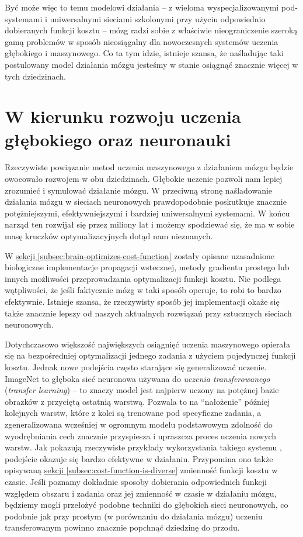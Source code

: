 Być może więc to temu modelowi działania -- z wieloma wyspecjalizowanymi pod-systemami i uniwersalnymi sieciami szkolonymi przy użyciu odpowiednio dobieranych funkcji kosztu -- mózg radzi sobie z właściwie nieograniczenie szeroką gamą problemów w sposób nieosiągalny dla nowoczesnych systemów uczenia głębokiego i maszynowego.
Co ta tym idzie, istnieje szansa, że naśladując taki postulowany model działania mózgu jesteśmy w stanie osiągnąć znacznie więcej w tych dziedzinach.

\section{W kierunku rozwoju uczenia głębokiego oraz neuronauki}

Rzeczywiste powiązanie metod uczenia maszynowego z działaniem mózgu będzie owocowało rozwojem w obu dziedzinach.
Głębokie uczenie pozwoli nam lepiej zrozumieć i symulować działanie mózgu.
W przeciwną stronę naśladowanie działania mózgu w sieciach neuronowych prawdopodobnie poskutkuje znacznie potężniejszymi, efektywniejszymi i bardziej uniwersalnymi systemami.
W końcu narząd ten rozwijał się przez miliony lat i możemy spodziewać się, że ma w sobie masę kruczków optymalizacyjnych dotąd nam nieznanych.

W \hyperref[subsec:brain-optimizes-cost-function]{sekcji \ref*{subsec:brain-optimizes-cost-function}} zostały opisane uzasadnione biologiczne implementacje propagacji wstecznej, metody gradientu prostego lub innych możliwości przeprowadzania optymalizacji funkcji kosztu.
Nie podlega wątpliwości, że jeśli faktycznie mózg w taki sposób operuje, to robi to bardzo efektywnie.
Istnieje szansa, że rzeczywisty sposób jej implementacji okaże się także znacznie lepszy od naszych aktualnych rozwiązań przy sztucznych sieciach neuronowych.

Dotychczasowo większość największych osiągnięć uczenia maszynowego opierała się na bezpośredniej optymalizacji jednego zadania z użyciem pojedynczej funkcji kosztu.
Jednak nowe podejścia często starające się generalizować uczenie.
ImageNet to głęboka sieć neuronowa używana do \emph{uczenia transferowanego} (\emph{transfer learning}) -- to znaczy model jest najpierw uczony na potężnej bazie obrazków z przyciętą ostatnią warstwą.
Pozwala to na ``nałożenie'' później kolejnych warstw, które z kolei są trenowane pod specyficzne zadania, a zgeneralizowana wcześniej w ogromnym modelu podstawowym zdolność do wyodrębniania cech znacznie przyspiesza i upraszcza proces uczenia nowych warstw.
Jak pokazują rzeczywiste przykłady wykorzystania takiego systemu \cite{marmanis2015deep}, podejście okazuje się bardzo efektywne w działaniu.
Przypomina ono także opisywaną \hyperref[subsec:cost-function-is-diverse]{sekcji \ref*{subsec:cost-function-is-diverse}} zmienność funkcji kosztu w czasie.
Jeśli poznamy dokładnie sposoby dobierania odpowiednich funkcji względem obszaru i zadania oraz jej zmienność w czasie w działaniu mózgu, będziemy mogli przełożyć podobne techniki do głębokich sieci neuronowych, co podobnie jak przy prostym (w porównaniu do działania mózgu) uczeniu transferowanym powinno znacznie popchnąć dziedzinę do przodu.

